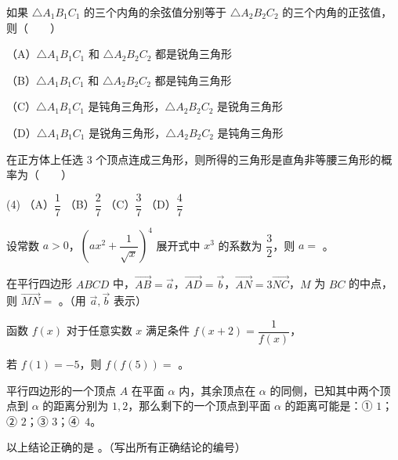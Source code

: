 \begin{question}
如果 $\triangle A_1B_1C_1$ 的三个内角的余弦值分别等于 $\triangle A_2B_2C_2$ 的三个内角的正弦值，则\mbox{（　　）}

（A）$\triangle A_1B_1C_1$ 和 $\triangle A_2B_2C_2$ 都是锐角三角形

（B）$\triangle A_1B_1C_1$ 和 $\triangle A_2B_2C_2$ 都是钝角三角形

（C）$\triangle A_1B_1C_1$ 是钝角三角形，$\triangle A_2B_2C_2$ 是锐角三角形

（D）$\triangle A_1B_1C_1$ 是锐角三角形，$\triangle A_2B_2C_2$ 是钝角三角形

\end{question}
\begin{question}
在正方体上任选 3 个顶点连成三角形，则所得的三角形是直角非等腰三角形的概率为\mbox{（　　）}

\begin{gkopts}(4)
\task （A）$\dfrac17$
\task （B）$\dfrac27$
\task （C）$\dfrac37$
\task （D）$\dfrac47$
\end{gkopts}

\end{question}

\begin{question}
设常数 $a>0$，$\left(ax^2+\dfrac1{\sqrt x}\right)^4$ 展开式中 $x^3$ 的系数为 $\dfrac32$，则 $a=$ \gkblank{}。

\end{question}
\begin{question}
在平行四边形 $ABCD$ 中，$\overrightarrow{AB}=\vec a$，$\overrightarrow{AD}=\vec b$，$\overrightarrow{AN}=3\overrightarrow{NC}$，$M$ 为 $BC$ 的中点，则 $\overrightarrow{MN}=$ \gkblank{}。（用 $\vec a,\vec b$ 表示）

\end{question}
\begin{question}
函数 $f(x)$ 对于任意实数 $x$ 满足条件 $f(x+2)=\dfrac1{f(x)}$，

若 $f(1)=-5$，则 $f(f(5))=$ \gkblank{}。

\end{question}
\begin{question}
平行四边形的一个顶点 $A$ 在平面 $\alpha$ 内，其余顶点在 $\alpha$ 的同侧，已知其中两个顶点到 $\alpha$ 的距离分别为 $1,2$，那么剩下的一个顶点到平面 $\alpha$ 的距离可能是：① $1$；② $2$；③ $3$；④~$4$。

以上结论正确的是 \gkblank{}。（写出所有正确结论的编号）

\end{question}

